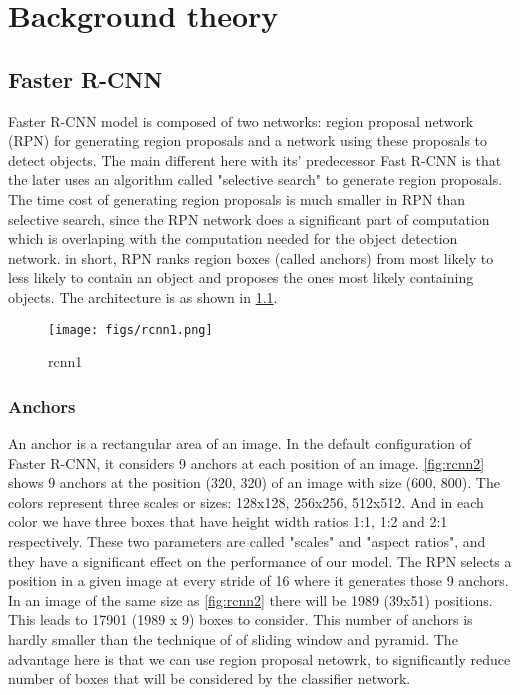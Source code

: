 \chapter{Background theory}
\section{Faster R-CNN}

Faster R-CNN model is composed of two networks: region proposal network (RPN) for generating region proposals and a network using these proposals to detect objects. The main different here with its' predecessor Fast R-CNN is that the later uses an algorithm called "selective search" to generate region proposals. The time cost of generating region proposals is much smaller in RPN than selective search, since the RPN network does a significant part of computation which is overlaping  with the computation needed for the  object detection network. in short, RPN ranks region boxes (called anchors) from most likely to less likely to contain an object and proposes the ones most likely containing objects. The architecture is as shown in  \cref{fig:rcnn1}.


\begin{figure}[ht]
	\centering
	\texttt{[image: figs/rcnn1.png]}
	\caption{rcnn1}\label{fig:rcnn1}
\end{figure}

\subsection{Anchors}
An anchor is a rectangular area of an image. In the default configuration of Faster R-CNN, it considers 9 anchors at each position of an image. \cref{fig:rcnn2} shows 9 anchors at the position (320, 320) of an image with size (600, 800). The colors represent three scales or sizes: 128x128, 256x256, 512x512. And in each color we have three boxes that have height width ratios 1:1, 1:2 and 2:1 respectively. These two parameters are called "scales" and "aspect ratios", and they have a significant effect on the performance of our model.
The RPN selects a position in a given image at every stride of 16 where it generates those 9 anchors. In an image of the same size as \cref{fig:rcnn2}  there will be 1989 (39x51) positions. This leads to 17901 (1989 x 9) boxes to consider. This number of anchors is hardly smaller than the technique of of sliding window and pyramid. The advantage here is that we can use region proposal netowrk, to significantly reduce number of boxes that will be considered by the classifier network.

